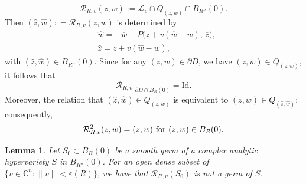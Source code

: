\documentclass[a4paper,centertags,oneside,12pt]{amsart}
\newtheorem{lemma}[theorem]{Lemma}
\numberwithin{equation}{section}
\begin{document}
\begin{equation*}
\mathcal R_{R, v}(z, w) := \mathcal L_v\cap Q_{(z, w)}\cap B_{R''}(0).
\end{equation*}
Then $(\widehat z, \widehat w): = \mathcal R_{R, v}(z, w)$ is determined by
\begin{equation*}
\begin{split}
&\widehat w = -\overline w + P\bigl(z+v(\widehat w-w),\,\overline z\bigr),\\
&\widehat z = z+v(\widehat w-w),
\end{split}
\end{equation*}
with $(\widehat z, \widehat w)\in B_{R''}(0)$.  
Since for any $(z, w)\in \partial D$, we have $(z, w)\in Q_{(z, w)}$, it follows that
$$\mathcal R_{R, v}|_{\partial D\cap B_R(0)} = \mathrm{Id}.$$
Moreover, the relation that $(\widehat z, \widehat w)\in Q_{(z, w)}$ is equivalent to $(z, w)\in Q_{(\widehat z, \widehat w)}$; consequently,
$$\mathcal R^2_{R, v} (z,w)= (z,w)\ \hbox{for } (z,w)\in B_R(0). $$
\begin{lemma}\label{2-3-lem1}
Let $S_0\subset B_R(0)$ be a smooth germ of a complex analytic  hypervariety $S$ in $B_{R''}(0)$.
    For an open dense subset of $\{v\in\mathbb C ^{n}: \|v\|<\varepsilon(R)\}$, we have that $\mathcal R_{R, v}(S_0)$ is not a germ of $S$.
\end{lemma}
\end{document}
